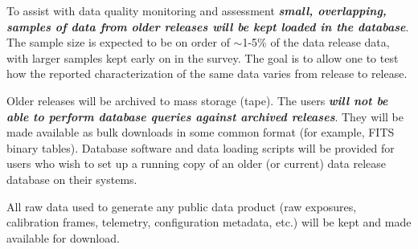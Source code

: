 \documentclass[SE,lsstdraft,toc]{lsstdoc}
\begin{document}
To assist with data quality monitoring and assessment \textbf{\emph{small, overlapping, samples of data from older releases will be kept loaded in the database}}. The sample size is expected to be on order of $\sim$1-5\% of the data release data, with larger samples kept early on in the survey. The goal is to allow one to test how the reported characterization of the same data varies from release to release.

Older releases will be archived to mass storage (tape). The users \textbf{\emph{will not be able to perform database queries against archived releases}}. They will be made available as bulk downloads in some common format (for example, FITS binary tables). Database software and data loading scripts will be provided for users who wish to set up a running copy of an older (or current) data release database on their systems.

All raw data used to generate any public data product (raw exposures, calibration frames, telemetry, configuration metadata, etc.) will be kept and made available for download. 
\end{document}
